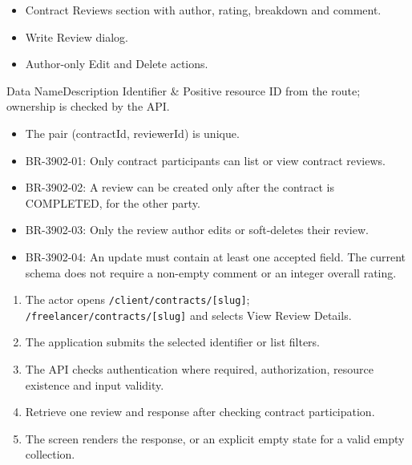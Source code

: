 \begin{itemize}[leftmargin=1.6em,topsep=3pt,itemsep=2pt,parsep=0pt,label=$\bullet$]
    \item Contract Reviews section with author, rating, breakdown and comment.
    \item Write Review dialog.
    \item Author-only Edit and Delete actions.
\end{itemize}


\begin{specdatatable}{Data Name}{Description}
Identifier & Positive resource ID from the route; ownership is checked by the API.\\ \hline
\end{specdatatable}

\begin{itemize}[leftmargin=1.6em,topsep=3pt,itemsep=2pt,parsep=0pt,label=$\bullet$]
    \item The pair (contractId, reviewerId) is unique.
\end{itemize}

\begin{itemize}[leftmargin=1.6em,topsep=3pt,itemsep=2pt,parsep=0pt,label=$\bullet$]\brrulelist
    \item BR-3902-01: Only contract participants can list or view contract reviews.
    \item BR-3902-02: A review can be created only after the contract is COMPLETED, for the other party.
    \item BR-3902-03: Only the review author edits or soft-deletes their review.
    \item BR-3902-04: An update must contain at least one accepted field. The current schema does not require a non-empty comment or an integer overall rating.
\end{itemize}

\begin{enumerate}[leftmargin=1.8em,topsep=3pt,itemsep=2pt,parsep=0pt]
    \item The actor opens \texttt{/\allowbreak{}client/\allowbreak{}contracts/\allowbreak{}[slug]}; \texttt{/\allowbreak{}freelancer/\allowbreak{}contracts/\allowbreak{}[slug]} and selects View Review Details.
    \item The application submits the selected identifier or list filters.
    \item The API checks authentication where required, authorization, resource existence and input validity.
    \item Retrieve one review and response after checking contract participation.
    \item The screen renders the response, or an explicit empty state for a valid empty collection.
\end{enumerate}


